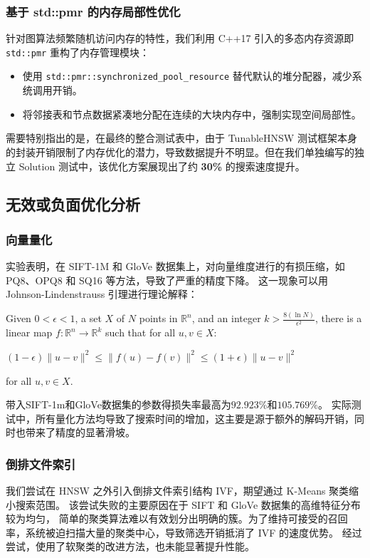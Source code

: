 \documentclass{article}
\begin{document}
\subsubsection{基于 std::pmr 的内存局部性优化}
针对图算法频繁随机访问内存的特性，我们利用 C++17 引入的多态内存资源即 \texttt{std::pmr} 重构了内存管理模块：
\begin{itemize}
    \item 使用 \texttt{std::pmr::synchronized\_pool\_resource} 替代默认的堆分配器，减少系统调用开销。
    \item 将邻接表和节点数据紧凑地分配在连续的大块内存中，强制实现空间局部性。
\end{itemize}

需要特别指出的是，在最终的整合测试表中，由于 TunableHNSW 测试框架本身的封装开销限制了内存优化的潜力，导致数据提升不明显。但在我们单独编写的独立 Solution 测试中，该优化方案展现出了约 \textbf{30\%} 的搜索速度提升。

\subsection{无效或负面优化分析}

\subsubsection{向量量化}
实验表明，在 SIFT-1M 和 GloVe 数据集上，对向量维度进行的有损压缩，如 PQ8、OPQ8 和 SQ16 等方法，导致了严重的精度下降。
这一现象可以用 Johnson-Lindenstrauss 引理进行理论解释：

\noindent Given $0 < \epsilon < 1$, a set $X$ of $N$ points in $\mathbb{R}^n$, and an integer $k > \frac{8(\ln N)}{\epsilon^2}$, there is a linear map $f: \mathbb{R}^n \to \mathbb{R}^k$ such that for all $u, v \in X$:

$(1 - \epsilon) \|u - v\|^2 \leq \|f(u) - f(v)\|^2 \leq (1 + \epsilon) \|u - v\|^2$

\noindent for all $u, v \in X$.

带入SIFT-1m和GloVe数据集的参数得损失率最高为$92.923\%$和$105.769\%$。
实际测试中，所有量化方法均导致了搜索时间的增加，这主要是源于额外的解码开销，同时也带来了精度的显著滑坡。

\subsubsection{倒排文件索引}
我们尝试在 HNSW 之外引入倒排文件索引结构 IVF，期望通过 K-Means 聚类缩小搜索范围。
该尝试失败的主要原因在于 SIFT 和 GloVe 数据集的高维特征分布较为均匀，
简单的聚类算法难以有效划分出明确的簇。为了维持可接受的召回率，系统被迫扫描大量的聚类中心，导致筛选开销抵消了 IVF 的速度优势。
经过尝试，使用了软聚类的改进方法，也未能显著提升性能。
\end{document}
